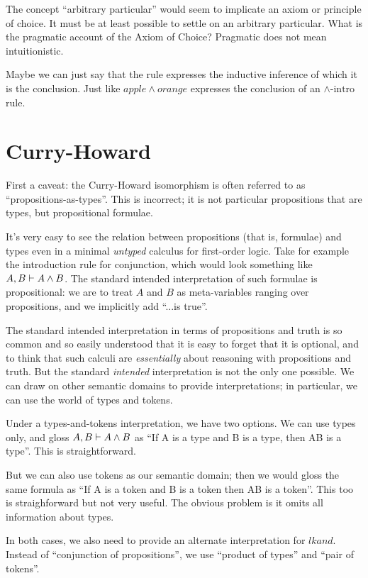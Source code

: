 \documentclass{article}
\begin{document}
The concept ``arbitrary particular'' would seem to implicate an axiom
or principle of choice. It must be at least possible to settle on an
arbitrary particular. What is the pragmatic account of the Axiom of
Choice? Pragmatic does not mean intuitionistic.

Maybe we can just say that the rule
expresses the inductive inference of which it is the conclusion. Just
like \(apple\land orange\) expresses the conclusion of an
\(\land\scriptstyle{\text{-intro}}\) rule.

\section{Curry-Howard}

First a caveat: the Curry-Howard isomorphism is often referred to as
``propositions-as-types''. This is incorrect; it is not particular
propositions that are types, but propositional formulae.

It's very easy to see the relation between propositions (that is,
formulae) and types even in a minimal \textit{untyped} calculus for
first-order logic. Take for example the introduction rule for
conjunction, which would look something like \(A, B\vdash A\land B\).
The standard intended interpretation of such formulae is
propositional: we are to treat \(A\) and \(B\) as meta-variables
ranging over propositions, and we implicitly add ``...is true''.

The standard intended interpretation in terms of propositions and
truth is so common and so easily understood that it is easy to forget
that it is optional, and to think that such calculi are
\textit{essentially} about reasoning with propositions and truth. But
the standard \textit{intended} interpretation is not the only one
possible. We can draw on other semantic domains to provide
interpretations; in particular, we can use the world of types and
tokens.

Under a types-and-tokens interpretation, we have two options. We can
use types only, and gloss \(A, B\vdash A\land B\) as ``If A is a type
and B is a type, then A\lkand B is a type''. This is straightforward.

But we can also use tokens as our semantic domain; then we would gloss
the same formula as ``If A is a token and B is a token then A\lkand B
is a token''. This too is straighforward but not very useful. The
obvious problem is it omits all information about types.

In both cases, we also need to provide an alternate interpretation for
\(lkand\). Instead of ``conjunction of propositions'', we use
``product of types'' and ``pair of tokens''.
\end{document}
